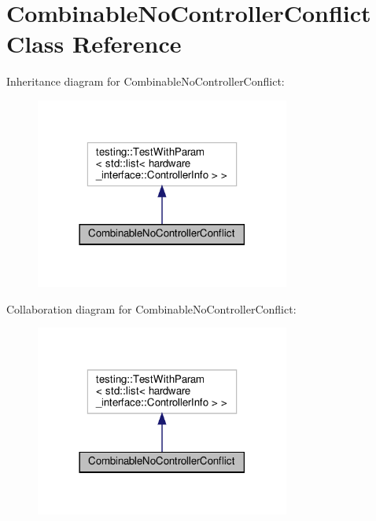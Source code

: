 \hypertarget{class_combinable_no_controller_conflict}{}\section{Combinable\+No\+Controller\+Conflict Class Reference}
\label{class_combinable_no_controller_conflict}


Inheritance diagram for Combinable\+No\+Controller\+Conflict\+:
\nopagebreak
\begin{figure}[H]
\begin{center}
\leavevmode
\includegraphics[width=237pt]{class_combinable_no_controller_conflict__inherit__graph}
\end{center}
\end{figure}


Collaboration diagram for Combinable\+No\+Controller\+Conflict\+:
\nopagebreak
\begin{figure}[H]
\begin{center}
\leavevmode
\includegraphics[width=237pt]{class_combinable_no_controller_conflict__coll__graph}
\end{center}
\end{figure}
